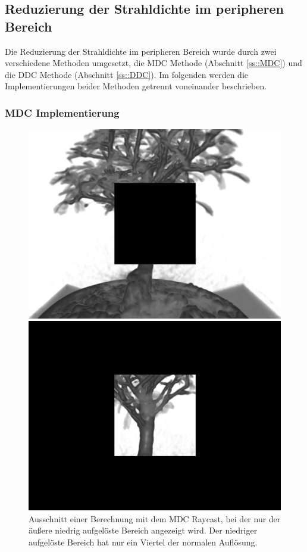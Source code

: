 \subsection{Reduzierung der Strahldichte im peripheren Bereich}
Die Reduzierung der Strahldichte im peripheren Bereich wurde durch zwei verschiedene Methoden umgesetzt, die MDC Methode (Abschnitt \ref{ss::MDC}) und die DDC Methode (Abschnitt \ref{ss::DDC}).
Im folgenden werden die Implementierungen beider Methoden getrennt voneinander beschrieben.

\subsubsection{MDC Implementierung}
\begin{figure}[]
	\centering
	\begin{minipage}[t]{0.49\textwidth}
		\centering
		\includegraphics[width=1\textwidth]{../../Grafiken/results/implementierung/mdc_ol.png}
		\caption{Ausschnitt einer Berechnung mit dem MDC Raycast, bei der nur der äußere niedrig aufgelöste Bereich angezeigt wird. Der niedriger aufgelöste Bereich hat nur ein Viertel der normalen Auflösung.}
		\label{fig::imp::mdc_ol}
	\end{minipage}
	\hfill
	\begin{minipage}[t]{0.49\textwidth}
		\centering
		\includegraphics[width=1\textwidth]{../../Grafiken/results/implementierung/mdc_il.png}

\end{minipage}
\end{figure}
